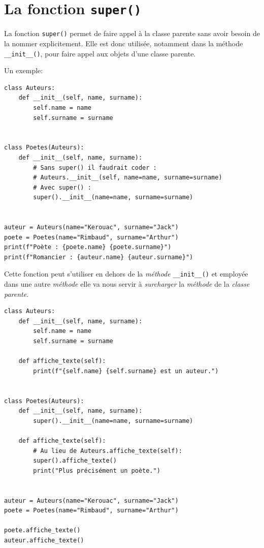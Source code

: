 \documentclass[a4paper,12pt]{book}
\begin{document}
\section{La fonction \texttt{super()}}
La fonction \texttt{super()} permet de faire appel à la classe parente sans avoir besoin de la nommer explicitement. Elle est donc utilisée, notamment dans la méthode \verb|__init__()|, pour faire appel aux objets d'une classe parente.
\medskip

Un exemple:
\begin{lstlisting}[caption=Fonction \texttt{super()} et méthode \texttt{.\_\_init\_\_()}]
class Auteurs:
    def __init__(self, name, surname):
        self.name = name
        self.surname = surname


class Poetes(Auteurs):
    def __init__(self, name, surname):
        # Sans super() il faudrait coder :
        # Auteurs.__init__(self, name=name, surname=surname)
        # Avec super() :
        super().__init__(name=name, surname=surname)


auteur = Auteurs(name="Kerouac", surname="Jack")
poete = Poetes(name="Rimbaud", surname="Arthur")
print(f"Poète : {poete.name} {poete.surname}")
print(f"Romancier : {auteur.name} {auteur.surname}")
\end{lstlisting}
\medskip

Cette fonction peut s'utiliser en dehors de la \textit{méthode} \verb|__init__()| et employée dans une autre \textit{méthode} elle va nous servir à \textit{surcharger} la \textit{méthode} de la \textit{classe parente}.
\medskip

\begin{lstlisting}[caption=Surcharge d'une \textit{méthode} de la \textit{classe parente}]
class Auteurs:
    def __init__(self, name, surname):
        self.name = name
        self.surname = surname

    def affiche_texte(self):
        print(f"{self.name} {self.surname} est un auteur.")


class Poetes(Auteurs):
    def __init__(self, name, surname):
        super().__init__(name=name, surname=surname)

    def affiche_texte(self):
        # Au lieu de Auteurs.affiche_texte(self):
        super().affiche_texte()  
        print("Plus précisément un poète.")


auteur = Auteurs(name="Kerouac", surname="Jack")
poete = Poetes(name="Rimbaud", surname="Arthur")

poete.affiche_texte()
auteur.affiche_texte()
\end{lstlisting}
\medskip
\end{document}
